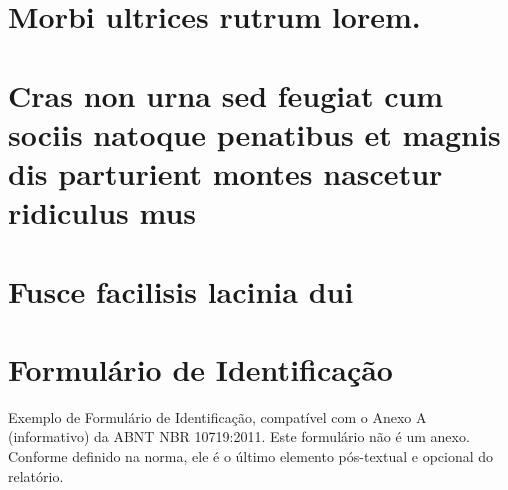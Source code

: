 \documentclass[
	12pt,				%
    oneside,			%
	a4paper,			%
	english,			%
	french,				%
	spanish,			%
	brazil,				%
	]{abntex2}
\begin{document}
\begin{anexosenv}

\partanexos

\chapter{Morbi ultrices rutrum lorem.}
\lipsum[30]

\chapter{Cras non urna sed feugiat cum sociis natoque penatibus et magnis dis
parturient montes nascetur ridiculus mus}

\lipsum[31]

\chapter{Fusce facilisis lacinia dui}

\lipsum[32]

\end{anexosenv}


\printindex

\chapter*[Formulário de Identificação]{Formulário de Identificação}
\label{formulado-identificacao}

Exemplo de Formulário de Identificação, compatível com o Anexo A (informativo)
da ABNT NBR 10719:2011. Este formulário não é um anexo. Conforme definido na
norma, ele é o último elemento pós-textual e opcional do relatório.

\bigskip
\end{document}
